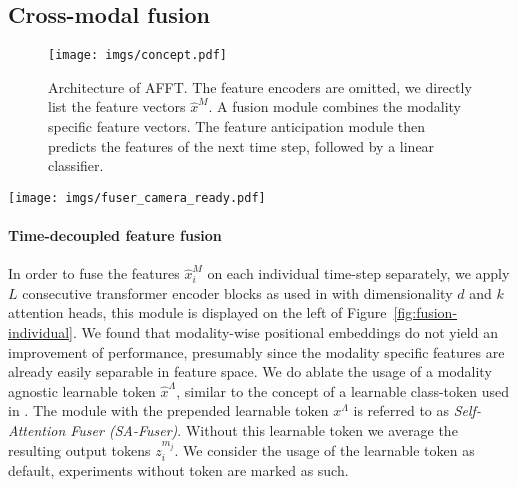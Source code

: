 \documentclass[10pt,twocolumn,letterpaper,dvipsnames]{article}
\newcommand{\sname}{AFFT}
\begin{document}
\subsection{Cross-modal fusion}
\label{sec:fusion-module}
\begin{figure}[t]
  \texttt{[image: imgs/concept.pdf]}
  \caption{Architecture of \sname. The feature encoders are omitted, we directly list the feature vectors $\hat{x}^M$. A fusion module combines the modality specific feature vectors. The feature anticipation module then predicts the features of the next time step, followed by a linear classifier.}
\label{fig:arch}
\end{figure}

\begin{figure*}[t]
\centering
  \texttt{[image: imgs/fuser\_camera\_ready.pdf]}
  \caption{The \emph{SA-Fuser} on the left applies Transformer Encoder blocks at individual time steps while the \emph{T-SA-Fuser} in the middle and the transformer decoder based \emph{CA-Fuser} on the right perform fusion on the whole temporal sequence at once.}
  \label{fig:fusion-individual}
\end{figure*}

\paragraph{Time-decoupled feature fusion}
\label{sec:cmtfuser}
In order to fuse the features $\hat{x}_i^M$ on each individual time-step  separately, we apply $L$ consecutive transformer encoder blocks as used in \cite{dosovitskiyImageWorth16x162021} with dimensionality $d$ and $k$ attention heads, this module is displayed on the left of Figure~\ref{fig:fusion-individual}.  We found that modality-wise positional embeddings do not yield an improvement of performance, presumably since the modality specific features are already easily separable in feature space. We do ablate the usage of a modality agnostic learnable token $\hat{x}^\Lambda$, similar to the concept of a learnable class-token used in \cite{dosovitskiyImageWorth16x162021}. The module with the prepended learnable token $x^{\Lambda}$ is referred to as \emph{Self-Attention Fuser (SA-Fuser)}. Without this learnable token we average the resulting output tokens $z_i^{m_j}$. We consider the usage of the learnable token as default, experiments without token are marked as such.
\end{document}
